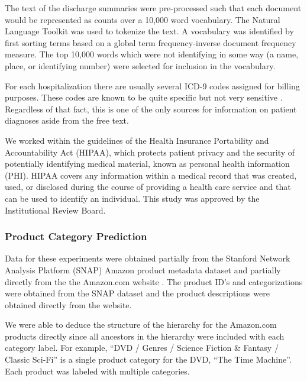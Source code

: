 \documentclass{article}
\begin{document}
The text of the discharge summaries were pre-processed such that each
document would be represented as counts over a 10,000 word vocabulary.
The Natural Language Toolkit was used to tokenize the text. A vocabulary
was identified by first sorting terms based on a global term frequency-inverse
document frequency measure. The top 10,000 words which were not identifying
in some way (a name, place, or identifying number) were selected for
inclusion in the vocabulary.

For each hospitalization there are usually several ICD-9 codes assigned
for billing purposes. These codes are known to be quite specific but
not very sensitive \citep{Birmetal2005}. Regardless of that fact,
this is one of the only sources for information on patient diagnoses
aside from the free text. %


We worked within the guidelines of the Health Insurance Portability
and Accountability Act (HIPAA), which protects patient privacy and
the security of potentially identifying medical material, known as
personal health information (PHI). HIPAA covers any information within
a medical record that was created, used, or disclosed during the course
of providing a health care service and that can be used to identify
an individual. This study was approved by the Institutional Review
Board.


\subsubsection{Product Category Prediction}

Data for these experiments were obtained partially from the Stanford
Network Analysis Platform (SNAP) Amazon product metadata dataset \citep{SNAP}
and partially directly from the the Amazon.com website \citep{AMAZON}.
The product ID's and categorizations were obtained from the SNAP dataset
and the product descriptions were obtained directly from the website.

We were able to deduce the structure of the hierarchy for the Amazon.com
products directly since all ancestors in the hierarchy were included
with each category label. For example, {}``DVD / Genres / Science
Fiction \& Fantasy / Classic Sci-Fi'' is a single product category
for the DVD, {}``The Time Machine''. Each product was labeled with
multiple categories.
\end{document}

